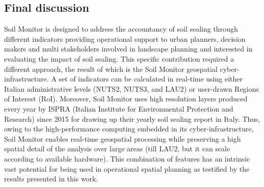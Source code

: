 \documentclass[APA,LATO1COL,doublespace]{WileyNJD-v2}
\newcommand{\toberevised}[1]{\emph{\textcolor{red}{#1}}} %
\newcommand{\update}[1]{\emph{\textcolor{blue}{#1}}}     %
\begin{document}
\subsection{Final discussion}
Soil Monitor is designed to address the accountancy of soil sealing through different indicators providing operational support to urban planners, decision makers and multi stakeholders involved in landscape planning and interested in evaluating the impact of soil sealing. 
This specific contribution required a different approach, the result of which is the Soil Monitor geospatial cyber-infrastructure. 
A set of indicators can be calculated in real-time using either Italian administrative levels (NUTS2, NUTS3, and LAU2) or user-drawn Regions of Interest (RoI). 
Moreover, Soil Monitor uses high resolution layers produced every year by ISPRA (Italian Institute for Environmental Protection and Research) since 2015 for drawing up their yearly soil sealing report in Italy. 
Thus, owing to the high-performance computing embedded in its cyber-infrastructure, Soil Monitor enables real-time geospatial processing while preserving a high spatial detail of the analysis over large areas (till LAU2, but it can scale according to available hardware).
This combination of features has an intrinsic vast potential for being used in operational spatial planning as testified by the results presented in this work. 
\end{document}
